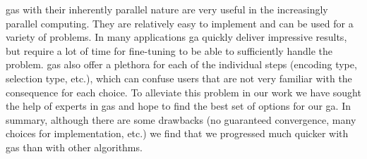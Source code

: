 \glspl{ga} with their inherently parallel nature are very useful in the increasingly parallel computing. They are relatively easy to implement and can be used for a variety of problems. In many applications \gls{ga} quickly deliver impressive results, but require a lot of time for fine-tuning to be able to sufficiently handle the problem. \glspl{ga} also offer a plethora for each of the individual steps (encoding type, selection type, etc.), which can confuse users that are not very familiar with the consequence for each choice. To alleviate this problem in our work we have sought the help of experts in \glspl{ga} and hope to find the best set of options for our \gls{ga}. 
In summary, although there are some drawbacks (no guaranteed convergence, many choices for implementation, etc.) we find that we progressed much quicker with \glspl{ga} than with other algorithms. 


